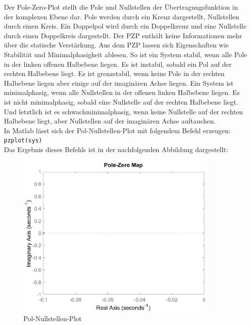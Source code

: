 Der Pole-Zero-Plot stellt die Pole und Nullstellen der Übertragungsfunktion in der komplexen Ebene dar. Pole werden durch ein Kreuz dargestellt, Nullstellen durch einen Kreis. Ein Doppelpol wird durch ein Doppelkreuz und eine Nullstelle durch einen Doppelkreis dargestellt. Der PZP enthält keine Informationen mehr über die statische Verstärkung. Aus dem PZP lassen sich Eigenschaften wie Stabilität und Minimalphasigkeit ablesen. So ist ein System stabil, wenn alle Pole in der linken offenen Halbebene liegen. Es ist instabil, sobald ein Pol auf der rechten Halbebene liegt. Es ist grenzstabil, wenn keine Pole in der rechten Halbebene liegen aber einige auf der imaginären Achse liegen. Ein System ist minimalphasig, wenn alle Nullstellen in der offenen linken Halbebene liegen. Es ist nicht minimalphasig, sobald eine Nullstelle auf der rechten Halbebene liegt. Und letztlich ist es schwachminimalphasig, wenn keine Nullstelle auf der rechten Halbebene liegt, aber Nullstellen auf der imaginären Achse auftauchen.\\
In Matlab lässt sich der Pol-Nullstellen-Plot mit folgendem Befehl erzeugen:\\
\hspace*{0.5cm}\texttt{pzplot(sys)}\\
Das Ergebnis dieses Befehls ist in der nachfolgenden Abbildung dargestellt:
\begin{figure}[H]
    \centering
    \includegraphics[width=10cm]{images_2/Rest/pzp.eps}
    \caption{Pol-Nullstellen-Plot}
\end{figure}